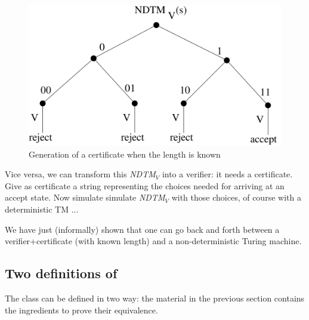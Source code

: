 \begin{figure}[h]
\begin{center}
\includegraphics[height=0.2\textheight,keepaspectratio]{nondetverifier}
\caption{Generation of a certificate when the length is
known}\label{nondetverifier}
\end{center}
\end{figure}

Vice versa, we can transform this {\em NDTM$_V$} into a verifier: it
needs a certificate. Give as certificate a string representing the
choices needed for arriving at an accept state. Now simulate simulate
{\em NDTM$_V$} with those choices, of course with a deterministic TM
...

We have just (informally) shown that one can go back and forth between
a verifier+certificate (with known length) and a non-deterministic
Turing machine.



\subsection{Two definitions of \NP}

The class \NP can be defined in two way: the material in the previous
section contains the ingredients to prove their equivalence.


